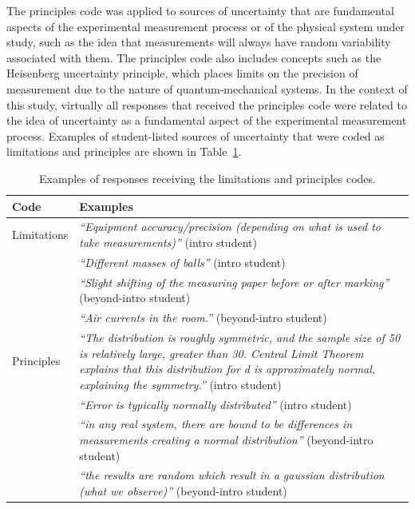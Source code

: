 \documentclass[english,aps,prstper,reprint,showpacs,longbibliography,superscriptaddress,nofootinbib]{revtex4-2}
\begin{document}
The principles code was applied to sources of uncertainty that are fundamental aspects of the experimental measurement process or of the physical system under study, such as the idea that measurements will always have random variability associated with them. The principles code also includes concepts such as the Heisenberg uncertainty principle, which places limits on the precision of measurement due to the nature of quantum-mechanical systems. In the context of this study, virtually all responses that received the principles code were related to the idea of uncertainty as a fundamental aspect of the experimental measurement process. Examples of student-listed sources of uncertainty that were coded as limitations and principles are shown in Table~\ref{ta:sources}.

\begin{table}[tb] 
  \caption{Examples of responses receiving the limitations and principles codes.}
  \label{ta:sources}
  \begin{ruledtabular}
    \begin{tabular}{p{}p{}}
    \textbf{Code} & \textbf{Examples}\\
      \hline
    Limitations & \textit{``Equipment accuracy/precision (depending on what is used to take measurements)''} (intro student)\\
    & \textit{``Different masses of balls''} (intro student) \\
    & \textit{``Slight shifting of the measuring paper before or after marking''} (beyond-intro student) \\
    & \textit{``Air currents in the room.''} (beyond-intro student) \\
    \hline
    Principles & \textit{``The distribution is roughly symmetric, and the sample size of 50 is relatively large, greater than 30. Central Limit Theorem explains that this distribution for d is approximately normal, explaining the symmetry.''} (intro student)  \\
    &\textit{``Error is typically normally distributed''} (intro student) \\
    & \textit{``in any real system, there are bound to be differences in measurements creating a normal distribution''} (beyond-intro student) \\
    & \textit{``the results are random which result in a gaussian distribution (what we observe)''} (beyond-intro student) \\
    \end{tabular}
  \end{ruledtabular}
\end{table}
\end{document}
